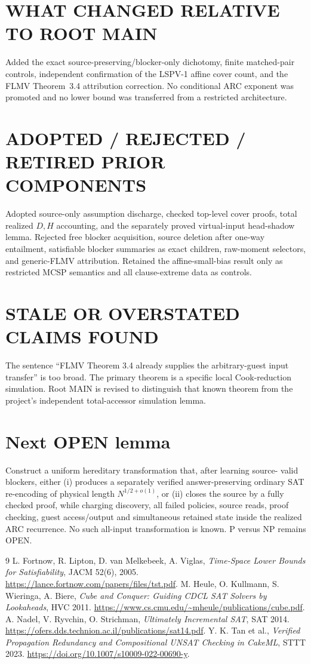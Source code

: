 \documentclass[11pt]{article}
\begin{document}
\section{WHAT CHANGED RELATIVE TO ROOT MAIN}
Added the exact source-preserving/blocker-only dichotomy, finite matched-pair
controls, independent confirmation of the LSPV-1 affine cover count, and the
FLMV Theorem~3.4 attribution correction.  No conditional ARC exponent was
promoted and no lower bound was transferred from a restricted architecture.

\section{ADOPTED / REJECTED / RETIRED PRIOR COMPONENTS}
Adopted source-only assumption discharge, checked top-level cover proofs,
total realized $D,H$ accounting, and the separately proved virtual-input
head-shadow lemma.  Rejected free blocker acquisition, source deletion after
one-way entailment, satisfiable blocker summaries as exact children, raw-moment
selectors, and generic-FLMV attribution.  Retained the affine-small-bias result
only as restricted MCSP semantics and all clause-extreme data as controls.

\section{STALE OR OVERSTATED CLAIMS FOUND}
The sentence ``FLMV Theorem 3.4 already supplies the arbitrary-guest input
transfer'' is too broad.  The primary theorem is a specific local Cook-reduction
simulation.  Root MAIN is revised to distinguish that known theorem from the
project's independent total-accessor simulation lemma.

\section{Next OPEN lemma}
Construct a uniform hereditary transformation that, after learning source-
valid blockers, either (i) produces a separately verified answer-preserving
ordinary SAT re-encoding of physical length $N^{1/2+o(1)}$, or (ii) closes the
source by a fully checked proof, while charging discovery, all failed policies,
source reads, proof checking, guest access/output and simultaneous retained
state inside the realized ARC recurrence.  No such all-input transformation is
known.  P versus NP remains OPEN.

\begin{thebibliography}{9}
 L. Fortnow, R. Lipton, D. van Melkebeek, A. Viglas,
\emph{Time-Space Lower Bounds for Satisfiability}, JACM 52(6), 2005.
\url{https://lance.fortnow.com/papers/files/tst.pdf}.
 M. Heule, O. Kullmann, S. Wieringa, A. Biere,
\emph{Cube and Conquer: Guiding CDCL SAT Solvers by Lookaheads}, HVC 2011.
\url{https://www.cs.cmu.edu/~mheule/publications/cube.pdf}.
 A. Nadel, V. Ryvchin, O. Strichman,
\emph{Ultimately Incremental SAT}, SAT 2014.
\url{https://ofers.dds.technion.ac.il/publications/sat14.pdf}.
 Y. K. Tan et al., \emph{Verified Propagation Redundancy and
Compositional UNSAT Checking in CakeML}, STTT 2023.
\url{https://doi.org/10.1007/s10009-022-00690-y}.
\end{thebibliography}
\end{document}
